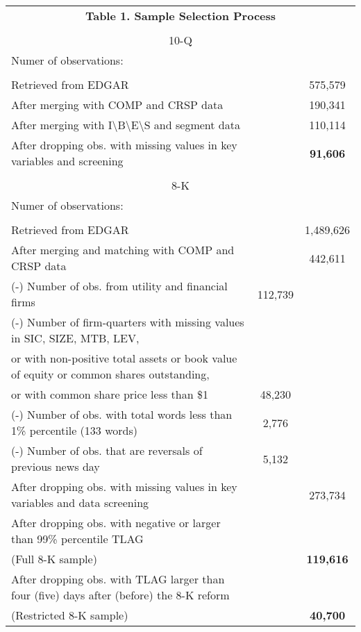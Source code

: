 \begin{table}[htbp] \label{T1}
  \centering
    \begin{tabular}{lcc}
    \multicolumn{3}{c}{\textbf{Table 1. Sample Selection Process}} \\ 
      & &  \\
    \multicolumn{3}{c}{10-Q} \\
    Numer of observations: &  &\\
      & &  \\
    Retrieved from EDGAR & & 575,579 \\
    After merging with COMP and CRSP data & & 190,341 \\
    After merging with I\textbackslash{}B\textbackslash{}E\textbackslash{}S and segment data & & 110,114 \\
    After dropping obs. with missing values in key variables and screening & & \textbf{91,606} \\
      & &  \\
    \multicolumn{3}{c}{8-K} \\
    Numer of observations: & &  \\
      & &  \\
    Retrieved from EDGAR & & 1,489,626 \\
    After merging and matching with COMP and CRSP data  & & 442,611 \\
    (-) Number of obs. from utility and financial firms & 112,739 & \\
    (-) Number of firm-quarters with missing values in SIC, SIZE, MTB, LEV, & & \\
    \hspace{5mm}or with non-positive total assets or book value of equity or common shares outstanding, & & \\
    \hspace{5mm}or with common share price less than \$1 & 48,230 & \\
    (-) Number of obs. with total words less than 1\% percentile (133 words) & 2,776 & \\
    (-) Number of obs. that are reversals of previous news day & 5,132 & \\
    \bottomrule
    After dropping obs. with missing values in key variables and data screening  & & 273,734 \\
    After dropping obs. with negative or larger than 99\% percentile TLAG &  &  \\
    (Full 8-K sample)& & \textbf{119,616} \\
    After dropping obs. with TLAG larger than four (five) days after (before) the 8-K reform &  & \\
    (Restricted 8-K sample) &  & \textbf{40,700} 
    \end{tabular}%
\end{table}%

